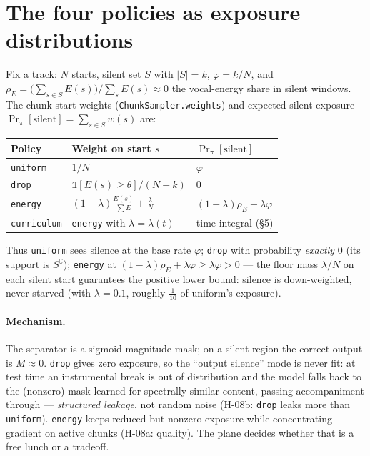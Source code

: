 \documentclass[11pt]{article}
\newcommand{\code}[1]{\texttt{#1}}
\newcommand{\Prsil}[1]{\Pr_{#1}[\text{silent}]}
\begin{document}
\section{The four policies as exposure distributions}
Fix a track: $N$ starts, silent set $S$ with $|S|=k$, $\varphi=k/N$, and
$\rho_E=\big(\sum_{s\in S}E(s)\big)/\sum_s E(s)\approx 0$ the vocal-energy share in silent
windows. The chunk-start weights (\code{ChunkSampler.weights}) and expected silent exposure
$\Prsil{\pi}=\sum_{s\in S}w(s)$ are:
\begin{center}
\begin{tabular}{lll}
\hline
Policy & Weight on start $s$ & $\Prsil{\pi}$ \\
\hline
\code{uniform} & $1/N$ & $\varphi$ \\
\code{drop} & $\mathbb{1}[E(s)\ge\theta]/(N-k)$ & $0$ \\
\code{energy} & $(1-\lambda)\frac{E(s)}{\sum E}+\frac{\lambda}{N}$ &
  $(1-\lambda)\rho_E+\lambda\varphi$ \\
\code{curriculum} & \code{energy} with $\lambda=\lambda(t)$ & time-integral (\S5) \\
\hline
\end{tabular}
\end{center}
Thus \code{uniform} sees silence at the base rate $\varphi$; \code{drop} with probability
\emph{exactly} $0$ (its support is $S^\complement$); \code{energy} at
$(1-\lambda)\rho_E+\lambda\varphi \ge \lambda\varphi>0$ --- the floor mass $\lambda/N$ on
each silent start guarantees the positive lower bound: silence is down-weighted, never
starved (with $\lambda=0.1$, roughly $\tfrac1{10}$ of uniform's exposure).

\paragraph{Mechanism.} The separator is a sigmoid magnitude mask; on a silent region the
correct output is $M\approx 0$. \code{drop} gives zero exposure, so the ``output silence''
mode is never fit: at test time an instrumental break is out of distribution and the model
falls back to the (nonzero) mask learned for spectrally similar content, passing
accompaniment through --- \emph{structured leakage}, not random noise (H-08b: \code{drop}
leaks more than \code{uniform}). \code{energy} keeps reduced-but-nonzero exposure while
concentrating gradient on active chunks (H-08a: quality). The plane decides whether that is
a free lunch or a tradeoff.
\end{document}
